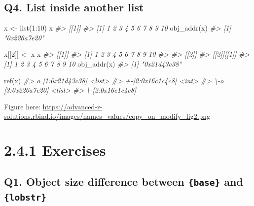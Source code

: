 \documentclass[
]{book}
\newenvironment{Shaded}{\begin{snugshade}}{\end{snugshade}}
\newcommand{\CommentTok}[1]{\textcolor[rgb]{0.56,0.35,0.01}{\textit{#1}}}
\newcommand{\DecValTok}[1]{\textcolor[rgb]{0.00,0.00,0.81}{#1}}
\newcommand{\FunctionTok}[1]{\textcolor[rgb]{0.00,0.00,0.00}{#1}}
\newcommand{\NormalTok}[1]{#1}
\newcommand{\OtherTok}[1]{\textcolor[rgb]{0.56,0.35,0.01}{#1}}
\newcommand{\SpecialCharTok}[1]{\textcolor[rgb]{0.00,0.00,0.00}{#1}}
\begin{document}
\hypertarget{q4.-list-inside-another-list}{%
\subsection*{Q4. List inside another list}\label{q4.-list-inside-another-list}}

\begin{Shaded}
\begin{Highlighting}[]
\NormalTok{x }\OtherTok{\textless{}{-}} \FunctionTok{list}\NormalTok{(}\DecValTok{1}\SpecialCharTok{:}\DecValTok{10}\NormalTok{)}
\NormalTok{x}
\CommentTok{\#\textgreater{} [[1]]}
\CommentTok{\#\textgreater{}  [1]  1  2  3  4  5  6  7  8  9 10}
\FunctionTok{obj\_addr}\NormalTok{(x)}
\CommentTok{\#\textgreater{} [1] "0x226a7e20"}

\NormalTok{x[[}\DecValTok{2}\NormalTok{]] }\OtherTok{\textless{}{-}}\NormalTok{ x}
\NormalTok{x}
\CommentTok{\#\textgreater{} [[1]]}
\CommentTok{\#\textgreater{}  [1]  1  2  3  4  5  6  7  8  9 10}
\CommentTok{\#\textgreater{} }
\CommentTok{\#\textgreater{} [[2]]}
\CommentTok{\#\textgreater{} [[2]][[1]]}
\CommentTok{\#\textgreater{}  [1]  1  2  3  4  5  6  7  8  9 10}
\FunctionTok{obj\_addr}\NormalTok{(x)}
\CommentTok{\#\textgreater{} [1] "0x21d43c38"}

\FunctionTok{ref}\NormalTok{(x)}
\CommentTok{\#\textgreater{} o [1:0x21d43c38] \textless{}list\textgreater{} }
\CommentTok{\#\textgreater{} +{-}[2:0x16c1c4c8] \textless{}int\textgreater{} }
\CommentTok{\#\textgreater{} \textbackslash{}{-}o [3:0x226a7e20] \textless{}list\textgreater{} }
\CommentTok{\#\textgreater{}   \textbackslash{}{-}[2:0x16c1c4c8]}
\end{Highlighting}
\end{Shaded}

Figure here:
\url{https://advanced-r-solutions.rbind.io/images/names_values/copy_on_modify_fig2.png}

\hypertarget{exercises-2}{%
\section{2.4.1 Exercises}\label{exercises-2}}

\hypertarget{q1.-object-size-difference-between-base-and-lobstr}{%
\subsection*{\texorpdfstring{Q1. Object size difference between \texttt{\{base\}} and \texttt{\{lobstr\}}}{Q1. Object size difference between \{base\} and \{lobstr\}}}\label{q1.-object-size-difference-between-base-and-lobstr}}
\end{document}
